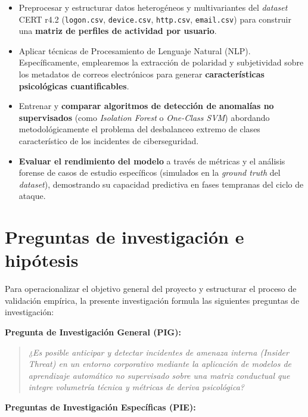 \documentclass[IB]{TFUOC}%
\begin{document}
\begin{itemize}
    \item Preprocesar y estructurar datos heterogéneos y multivariantes del \textit{dataset} CERT r4.2 (\texttt{logon.csv}, \texttt{device.csv}, \texttt{http.csv}, \texttt{email.csv}) para construir una \textbf{matriz de perfiles de actividad por usuario}.
    \item Aplicar técnicas de Procesamiento de Lenguaje Natural (NLP). Específicamente, emplearemos la extracción de polaridad y subjetividad sobre los metadatos de correos electrónicos para generar \textbf{características psicológicas cuantificables}.
    \item Entrenar y \textbf{comparar algoritmos de detección de anomalías no supervisados} (como \textit{Isolation Forest} o \textit{One-Class SVM}) abordando metodológicamente el problema del desbalanceo extremo de clases característico de los incidentes de ciberseguridad.
    \item \textbf{Evaluar el rendimiento del modelo} a través de métricas y el análisis forense de casos de estudio específicos (simulados en la \textit{ground truth} del \textit{dataset}), demostrando su capacidad predictiva en fases tempranas del ciclo de ataque.
\end{itemize}

\section{Preguntas de investigación e hipótesis}

Para operacionalizar el objetivo general del proyecto y estructurar el proceso de validación empírica, la presente investigación formula las siguientes preguntas de investigación:

\medskip
\noindent\textbf{Pregunta de Investigación General (PIG):}

\begin{quote}
\textit{¿Es posible anticipar y detectar incidentes de amenaza interna (\textit{Insider Threat}) en un entorno corporativo mediante la aplicación de modelos de aprendizaje automático no supervisado sobre una matriz conductual que integre volumetría técnica y métricas de deriva psicológica?}
\end{quote}

\noindent\textbf{Preguntas de Investigación Específicas (PIE):}
\end{document}
